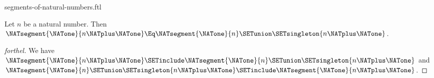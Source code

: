 \documentclass{stex}
\begin{document}
\begin{smodule}{segments-of-natural-numbers.ftl}
\begin{proposition}[forthel]
  Let $n$ be a natural number.
  Then $\NATsegment{\NATone}{n \NATplus \NATone} \Eq \NATsegment{\NATone}{n} \SETunion \SETsingleton{n \NATplus \NATone}$.
\end{proposition}
\begin{proof}[forthel]
  We have
  $\NATsegment{\NATone}{n \NATplus \NATone} \SETinclude \NATsegment{\NATone}{n} \SETunion \SETsingleton{n \NATplus \NATone}$ and $\NATsegment{\NATone}{n} \SETunion \SETsingleton{n \NATplus \NATone} \SETinclude \NATsegment{\NATone}{n \NATplus \NATone}$.
\end{proof}
\end{smodule}
\end{document}

